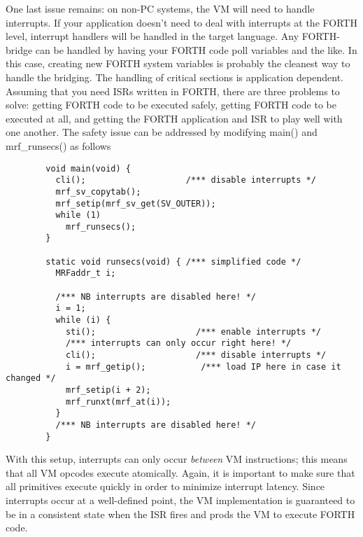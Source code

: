\documentclass{article}
\begin{document}
One last issue remains: on non-PC systems, the VM will need to handle
interrupts. If your application doesn't need to deal with interrupts
at the FORTH level, interrupt handlers will be handled in the target
language. Any FORTH-bridge can be handled by having your FORTH code
poll variables and the like. In this case, creating new FORTH system
variables is probably the cleanest way to handle the bridging. The
handling of critical sections is application dependent. Assuming that
you need ISRs written in FORTH, there are three problems to solve:
getting FORTH code to be executed safely, getting FORTH code to be
executed at all, and getting the FORTH application and ISR to play
well with one another. The safety issue can be addressed by modifying
main() and mrf\_runsecs() as follows
\begin{verbatim}
        void main(void) {
          cli();                    /*** disable interrupts */
          mrf_sv_copytab();
          mrf_setip(mrf_sv_get(SV_OUTER));
          while (1)
            mrf_runsecs();
        }

        static void runsecs(void) { /*** simplified code */
          MRFaddr_t i;
        
          /*** NB interrupts are disabled here! */
          i = 1;
          while (i) {
            sti();                    /*** enable interrupts */
            /*** interrupts can only occur right here! */
            cli();                    /*** disable interrupts */
            i = mrf_getip();           /*** load IP here in case it changed */
            mrf_setip(i + 2);
            mrf_runxt(mrf_at(i));
          }
          /*** NB interrupts are disabled here! */
        }
\end{verbatim}
With this setup, interrupts can only occur \textit{between} VM
instructions; this means that all VM opcodes execute atomically. Again,
it is important to make sure that all primitives execute quickly in
order to minimize interrupt latency. Since interrupts occur at
a well-defined point, the VM implementation is guaranteed to be in a
consistent state when the ISR fires and prods the VM to execute FORTH
code.
\end{document}
